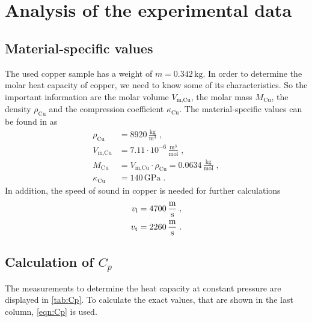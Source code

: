 \section{Analysis of the experimental data}
\label{sec:Auswertung}

%

\subsection{Material-specific values}

The used copper sample has a weight of $m= 0.342 \, \unit{\kilo \gram}$.
In order to determine the molar heat capacity of copper, we need to know some of its characteristics.
So the important information are the molar volume $V_{\text{m,Cu}}$, the molar mass $M_{\text{Cu}}$, the density $\rho_{\text{Cu}}$ and 
the compression coefficient $\kappa_{\text{Cu}}$. 
The material-specific values can be found in \cite{6} as
\begin{align*}
    \rho_{\text{Cu}}&= 8920\,  \frac{\unit{\kilo \gram}}{\unit{\meter}^3} \; , \\
    V_{\text{m,Cu}}&=7.11 \cdot 10^{-6}\, \frac{\unit{\meter}^3}{\text{mol}} \; ,\\
    M_{\text{Cu}}&= V_{\text{m,Cu}} \cdot \rho_{\text{Cu}}= 0.0634\, \frac{\unit{\kilo \gram}}{\text{mol}}\; ,\\
    \kappa_{\text{Cu}}&= 140\, \unit{\giga \pascal}\; .
\end{align*}
In addition, the speed of sound in copper \cite{ap47} is needed for further calculations
\begin{align*}
    v_{\text{l}}&=4700\, \unit{\frac{\meter}{\second}}\; ,\\
v_{\text{t}}&=2260\, \unit{\frac{\meter}{\second}} \; .
\end{align*}

\subsection{Calculation of $C_{p}$}
The measurements to determine the heat capacity at constant pressure are displayed in \autoref{tab:Cp}.
To calculate the exact values, that are shown in the last column, \autoref{eqn:Cp} is used. 

